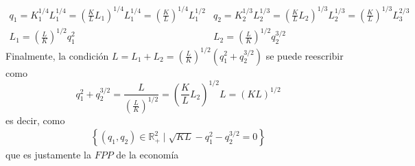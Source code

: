 \begin{enumerate}[a)]
			$$
				\begin{array}{c|c}
					q_1 = K_{1}^{1/4}L_{1}^{1/4} = \left( \frac{K}{L}L_1\right)^{1/4} L_{1}^{1/4} = \left( \frac{K}{L}\right)^{1/4}L_{1}^{1/2} & q_2 = K_{2}^{1/3}L_{2}^{1/3} = \left( \frac{K}{L}L_2\right)^{1/3} L_{2}^{1/3} = \left( \frac{K}{L}\right)^{1/3}L_{3}^{2/3}\\[0.3cm]
					L_1 = \left( \frac{L}{K}\right)^{1/2}q_{1}^{2} & L_2 = \left( \frac{L}{K}\right) ^{1/2}q_{2}^{3/2}
				\end{array}
			$$
		Finalmente, la condición $L = L_1+L_2 = \left( \frac{L}{K}\right) ^{1/2}\left( q_{1}^{2}+q_{2}^{3/2}\right) $ se puede reescribir como
			$$q_{1}^{2}+q_{2}^{3/2} = \frac{L}{\left( \frac{L}{K}\right) ^{1/2}} = \left( \frac{K}{L}L_2\right)^{1/2}L = (KL)^{1/2}$$
		es decir, como
			\begin{gather}
				\left\lbrace \left(q_1,q_2 \right) \in \mathbb{R}_{+}^{2} \mid \sqrt{KL} - q_{1}^{2} - q_{2}^{3/2} = 0 \right\rbrace \label{eq7}
			\end{gather}
		que es justamente la $FPP$ de la economía\\
		

\end{enumerate}
